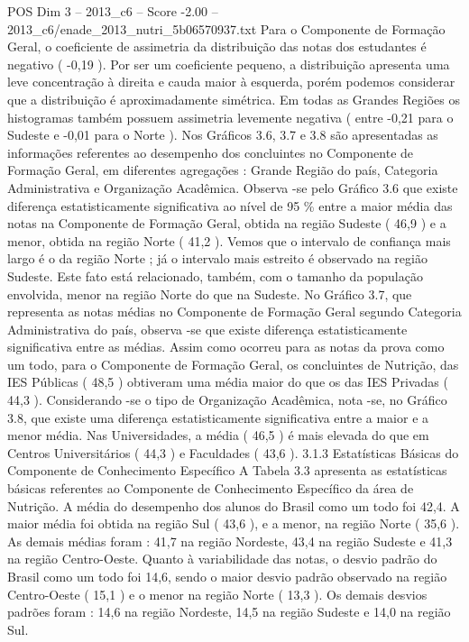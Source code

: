 \begin{textsample}{POS Dim 3 – 2013\_c6 – Score -2.00 – 2013\_c6/enade\_2013\_nutri\_5b06570937.txt}
Para o Componente de Formação Geral, o coeficiente de assimetria da distribuição das notas dos estudantes é negativo ( -0,19 ).
Por ser um coeficiente pequeno, a distribuição apresenta uma leve concentração à direita e cauda maior à esquerda, porém podemos considerar que a distribuição é aproximadamente simétrica.
Em todas as Grandes Regiões os histogramas também possuem assimetria levemente negativa ( entre -0,21 para o Sudeste e -0,01 para o Norte ).
Nos Gráficos 3.6, 3.7 e 3.8 são apresentadas as informações referentes ao desempenho dos concluintes no Componente de Formação Geral, em diferentes agregações : Grande Região do país, Categoria Administrativa e Organização Acadêmica.
Observa -se pelo Gráfico 3.6 que existe diferença estatisticamente significativa ao nível de 95 \% entre a maior média das notas na Componente de Formação Geral, obtida na região Sudeste ( 46,9 ) e a menor, obtida na região Norte ( 41,2 ).
Vemos que o intervalo de confiança mais largo é o da região Norte ; já o intervalo mais estreito é observado na região Sudeste.
Este fato está relacionado, também, com o tamanho da população envolvida, menor na região Norte do que na Sudeste.
No Gráfico 3.7, que representa as notas médias no Componente de Formação Geral segundo Categoria Administrativa do país, observa -se que existe diferença estatisticamente significativa entre as médias.
Assim como ocorreu para as notas da prova como um todo, para o Componente de Formação Geral, os concluintes de Nutrição, das IES Públicas ( 48,5 ) obtiveram uma média maior do que os das IES Privadas ( 44,3 ).
Considerando -se o tipo de Organização Acadêmica, nota -se, no Gráfico 3.8, que existe uma diferença estatisticamente significativa entre a maior e a menor média.
Nas Universidades, a média ( 46,5 ) é mais elevada do que em Centros Universitários ( 44,3 ) e Faculdades ( 43,6 ). 3.1.3 Estatísticas Básicas do Componente de Conhecimento Específico A Tabela 3.3 apresenta as estatísticas básicas referentes ao Componente de Conhecimento Específico da área de Nutrição.
A média do desempenho dos alunos do Brasil como um todo foi 42,4.
A maior média foi obtida na região Sul ( 43,6 ), e a menor, na região Norte ( 35,6 ).
As demais médias foram : 41,7 na região Nordeste, 43,4 na região Sudeste e 41,3 na região Centro-Oeste.
Quanto à variabilidade das notas, o desvio padrão do Brasil como um todo foi 14,6, sendo o maior desvio padrão observado na região Centro-Oeste ( 15,1 ) e o menor na região Norte ( 13,3 ).
Os demais desvios padrões foram : 14,6 na região Nordeste, 14,5 na região Sudeste e 14,0 na região Sul.

\end{textsample}
